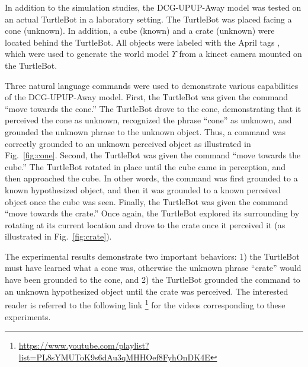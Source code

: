 In addition to the simulation studies, the DCG-UPUP-Away model was tested on an actual TurtleBot in a laboratory setting.
The TurtleBot was placed facing %
a cone (unknown).
In addition, a cube (known) and a crate (unknown) were located behind the TurtleBot.
All objects were labeled with the April tags \cite{olson2011}, which were used to generate the world model $\Upsilon$ from a kinect camera mounted on the TurtleBot.

Three natural language commands were used to demonstrate various capabilities of the DCG-UPUP-Away model.
First, the TurtleBot was given the command ``move towards the cone.''
The TurtleBot drove to the cone, demonstrating that it perceived the cone as unknown, recognized the phrase ``cone'' as unknown, and grounded the unknown phrase to the unknown object.
Thus, a command was correctly grounded to an unknown perceived object as illustrated in Fig.~\ref{fig:cone}.
Second, the TurtleBot was given the command ``move towards the cube.''
The TurtleBot rotated in place until the cube came in perception, and then approached the cube.
In other words, the command was first grounded to a known hypothesized object, and then it was grounded to a known perceived object once the cube was seen. 
Finally, the TurtleBot was given the command ``move towards the crate.''
Once again, the TurtleBot explored its surrounding by rotating at its current location and drove to the crate once it perceived it (as illustrated in Fig.~\ref{fig:crate}). %

The experimental results demonstrate two important behaviors: 1) the TurtleBot must have learned what a cone was, otherwise the unknown phrase ``crate'' would have been grounded to the cone, and 2) the TurtleBot grounded the command to an unknown hypothesized object until the crate was perceived. The interested reader is referred to the following link \footnote{\url{https://www.youtube.com/playlist?list=PL8sYMUToK9s6dAu3qMHHOef8FyhOnDK4E}} for the videos corresponding to these experiments.

